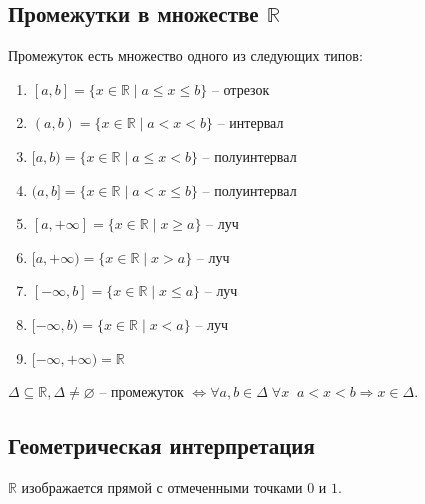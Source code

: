\subsection{Промежутки в множестве $\mathbb{R}$}
Промежуток есть множество одного из следующих типов:
\begin{enumerate}
\item $[a,b] =\{x\in\mathbb{R}\mid a\leq x\leq b\}$ -- отрезок
\item $(a,b) =\{x\in\mathbb{R}\mid a< x< b\}$ -- интервал
\item $[a,b) =\{x\in\mathbb{R}\mid a\leq x< b\}$ -- полуинтервал
\item $(a,b] =\{x\in\mathbb{R}\mid a< x\leq b\}$ -- полуинтервал
\item $[a, +\infty] =\{x\in\mathbb{R}\mid x\geq a\}$ -- луч
\item $[a,+\infty) =\{x\in\mathbb{R}\mid x>a\}$ -- луч
\item $[-\infty,b] =\{x\in\mathbb{R}\mid x\leq a\}$ -- луч
\item $[-\infty,b) =\{x\in\mathbb{R}\mid x<a\}$ -- луч
\item $[-\infty,+\infty) =\mathbb{R}$ 
\end{enumerate}

$\Delta\subseteq\mathbb{R}, \Delta\neq\varnothing$ -- промежуток $\Leftrightarrow \forall a, b\in\Delta\; \forall x \;\; a<x<b \Rightarrow x\in\Delta.$
\subsection{Геометрическая интерпретация}
$\mathbb{R}$ изображается прямой с отмеченными точками $0$ и $1.$
\begin{figure}[h]
\end{figure}
